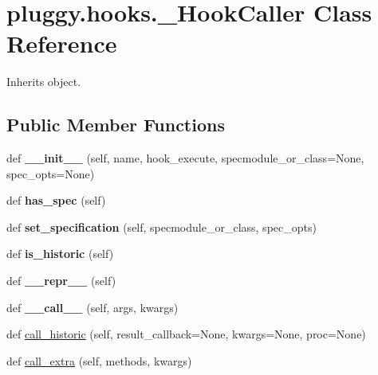 \hypertarget{classpluggy_1_1hooks_1_1___hook_caller}{}\section{pluggy.\+hooks.\+\_\+\+Hook\+Caller Class Reference}
\label{classpluggy_1_1hooks_1_1___hook_caller}


Inherits object.

\subsection*{Public Member Functions}
\begin{DoxyCompactItemize}
\item 
\mbox{\label{classpluggy_1_1hooks_1_1___hook_caller_adaa87c74527931a83053ed03fffc1102}} 
def {\bfseries \+\_\+\+\_\+init\+\_\+\+\_\+} (self, name, hook\+\_\+execute, specmodule\+\_\+or\+\_\+class=None, spec\+\_\+opts=None)
\item 
\mbox{\label{classpluggy_1_1hooks_1_1___hook_caller_a51bd7ef06d5396d4f31c082cb0b40ba7}} 
def {\bfseries has\+\_\+spec} (self)
\item 
\mbox{\label{classpluggy_1_1hooks_1_1___hook_caller_a33b760a1b38084fd6960d12c9d5effe5}} 
def {\bfseries set\+\_\+specification} (self, specmodule\+\_\+or\+\_\+class, spec\+\_\+opts)
\item 
\mbox{\label{classpluggy_1_1hooks_1_1___hook_caller_a640689fec034d4304214e7dbb54d98b0}} 
def {\bfseries is\+\_\+historic} (self)
\item 
\mbox{\label{classpluggy_1_1hooks_1_1___hook_caller_ad46ebf4fc58af9626c8132dc2da154e4}} 
def {\bfseries \+\_\+\+\_\+repr\+\_\+\+\_\+} (self)
\item 
\mbox{\label{classpluggy_1_1hooks_1_1___hook_caller_a34faa15882784945f30cb7d60d5e06d9}} 
def {\bfseries \+\_\+\+\_\+call\+\_\+\+\_\+} (self, args, kwargs)
\item 
def \hyperlink{classpluggy_1_1hooks_1_1___hook_caller_a4080f2f853664dcb18c46ab6638b23e6}{call\+\_\+historic} (self, result\+\_\+callback=None, kwargs=None, proc=None)
\item 
def \hyperlink{classpluggy_1_1hooks_1_1___hook_caller_a2e890e73bd2b846c3894135c0b8e5975}{call\+\_\+extra} (self, methods, kwargs)
\end{DoxyCompactItemize}
